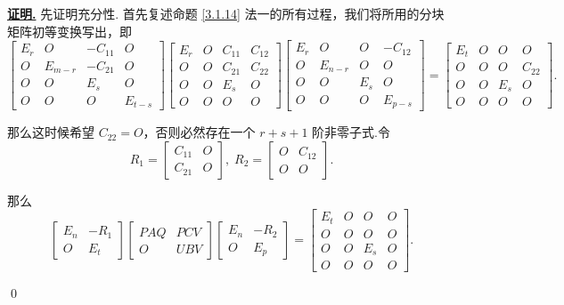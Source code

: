 \documentclass[10pt,openany]{article}
\theoremstyle{thmstyle} %
\theoremstyle{defstyle} %
\theoremstyle{prostyle} %
\theoremstyle{exastyle}
\theoremstyle{remstyle}
\renewenvironment{proof}[1][证明]{\par\underline{\textbf{#1.}} \;\fangsong}{\qed\par}
\begin{document}
\begin{proof}
	先证明充分性. 首先复述命题 \ref{3.1.14} 法一的所有过程，我们将所用的分块矩阵初等变换写出，即
	\[ \begin{bmatrix}
		E_r & O & -C_{11} & O \\
		O & E_{m-r} & -C_{21} & O \\
		O & O & E_s & O \\
		O & O & O & E_{t-s}
	\end{bmatrix} \begin{bmatrix}
		E_r & O & C_{11} & C_{12} \\
		O & O & C_{21} & C_{22} \\
		O & O & E_s & O \\
		O & O & O & O
	\end{bmatrix}\begin{bmatrix}
		E_r & O & O & -C_{12} \\
		O & E_{n-r} & O & O \\
		O & O & E_s & O \\
		O & O & O & E_{p-s}
	\end{bmatrix}=\begin{bmatrix}
		E_t & O & O & O \\
		O & O & O & C_{22} \\
		O & O & E_s & O \\
		O & O & O & O
	\end{bmatrix}.  \]
	
	那么这时候希望 \( C_{22}=O \)，否则必然存在一个 \( r+s+1 \) 阶非零子式.令
	\[ R_1= \begin{bmatrix}
		C_{11} & O \\ C_{21} & O
	\end{bmatrix}, \; R_2=\begin{bmatrix}
		O & C_{12} \\ O & O 
	\end{bmatrix}. \]
	
	那么
	\[ \begin{bmatrix}
		E_n & -R_1 \\ O & E_t
	\end{bmatrix}\begin{bmatrix}
		PAQ &  PCV \\ O & UBV
	\end{bmatrix}\begin{bmatrix}
		E_n & -R_2 \\ O & E_p
	\end{bmatrix}=\begin{bmatrix}
		E_t & O & O & O \\
		O & O & O & O \\
		O & O & E_s & O \\
		O & O & O & O
	\end{bmatrix}. \]
	

\end{proof}
\end{document}
